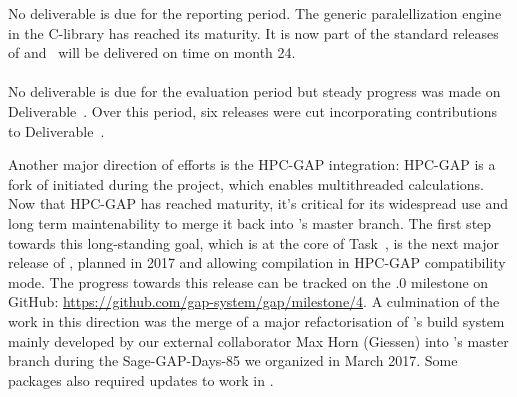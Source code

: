 \documentclass{deliverablereport}
\begin{document}
No deliverable is due for the reporting period.
The generic paralellization engine in the \Pari C-library
has reached its maturity. It is now part of the standard releases of \Pari
and~
will be delivered on time on month 24.

\paragraph{}

No deliverable is due for the evaluation period but steady progress was made on
Deliverable~. Over this period, six releases were cut
incorporating contributions to Deliverable~.

Another major direction of efforts is the HPC-GAP integration:
HPC-GAP is a fork of \GAP initiated during the \scienceproject project, which
enables multithreaded calculations. Now that HPC-GAP has reached
maturity, it's critical for its widespread use and long term
maintenability to merge it back into \GAP's master branch.
The first step towards this long-standing goal, which is at the core of
Task~, is the next
major release of , planned in 2017 and allowing compilation in HPC-GAP
compatibility mode. The progress towards this release can be tracked on the .0 milestone on GitHub: \url{https://github.com/gap-system/gap/milestone/4}.
A culmination of the work in this direction was the merge of a major
refactorisation of \GAP's build system
mainly developed by our external collaborator Max Horn (Giessen) into \GAP's master
branch during the Sage-GAP-Days-85 we organized in March 2017. Some
\GAP packages also required updates to work in .

\paragraph{}
\end{document}
